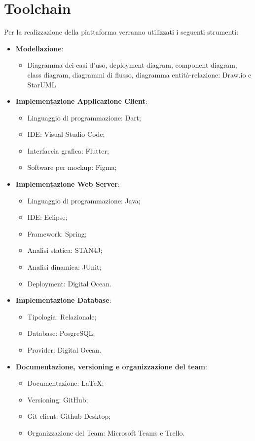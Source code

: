 \section{Toolchain}
Per la realizzazione della piattaforma verranno utilizzati i seguenti strumenti:
\begin{itemize}
	\item \textbf{Modellazione}:
	\begin{itemize}
		\item Diagramma dei casi d'uso, deployment diagram, component diagram, class
		diagram, diagrammi di flusso, diagramma entità-relazione: Draw.io e StarUML
	\end{itemize}
	\item \textbf{Implementazione Applicazione Client}:
	\begin{itemize}
		\item Linguaggio di programmazione: Dart;
		\item IDE: Visual Studio Code;
		\item Interfaccia grafica: Flutter;
		\item Software per mockup: Figma;
	\end{itemize}
	\item \textbf{Implementazione Web Server}:
	\begin{itemize}
		\item Linguaggio di programmazione: Java;
		\item IDE: Eclipse;
		\item Framework: Spring;
		\item Analisi statica: STAN4J;
		\item Analisi dinamica: JUnit;
		\item Deployment: Digital Ocean.
	\end{itemize}
	\item \textbf{Implementazione Database}:
	\begin{itemize}
		\item Tipologia: Relazionale;
		\item Database: PosgreSQL;
		\item Provider: Digital Ocean.
	\end{itemize}
	\item \textbf{Documentazione, versioning e organizzazione del team}:
	\begin{itemize}
		\item Documentazione: LaTeX;
		\item Versioning: GitHub;
		\item Git client: Github Desktop;
		\item Organizzazione del Team: Microsoft Teams e Trello.
	\end{itemize}
\end{itemize}